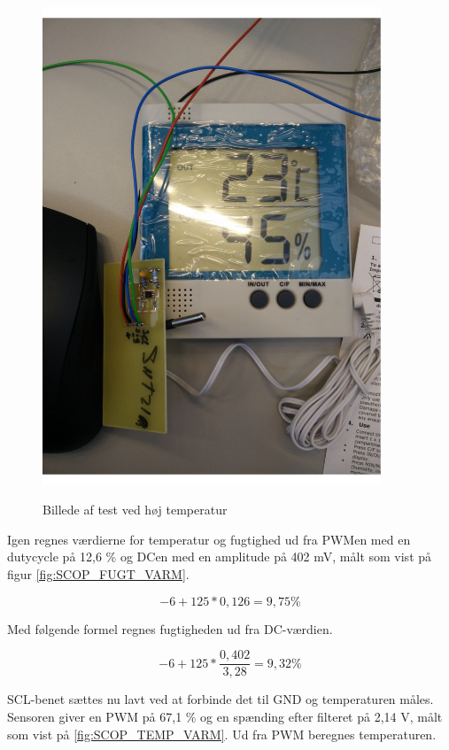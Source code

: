 \begin{figure}[H]
\centering
{\includegraphics[width=0.90\textwidth]{filer/modultest/Billeder/test_STUE}}
\caption{Billede af test ved høj temperatur}
\label{lab:TEST_VARM}
\end{figure}

Igen regnes værdierne for temperatur og fugtighed ud fra PWMen med en dutycycle på 12,6 \% og DCen med en amplitude på 402 mV, målt som vist på figur \ref{fig:SCOP_FUGT_VARM}.

\begin{equation}
-6+125*0,126= 9,75\%
\end{equation}

Med følgende formel regnes fugtigheden ud fra DC-værdien.

\begin{equation}
-6+125*\frac{0,402}{3,28}= 9,32\%
\end{equation}

SCL-benet sættes nu lavt ved at forbinde det til GND og temperaturen måles. Sensoren giver en PWM på 67,1 \% og en spænding efter filteret på 2,14 V, målt som vist på \ref{fig:SCOP_TEMP_VARM}. 
Ud fra PWM beregnes temperaturen.


